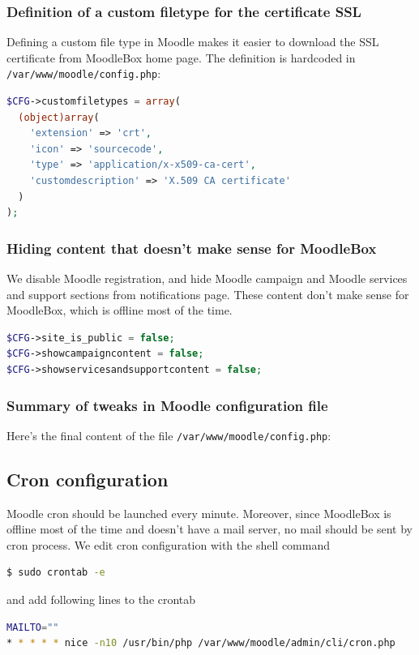 \documentclass[12pt]{article}
\begin{document}
\subsubsection{Definition of a custom filetype for the certificate SSL}

Defining a custom file type in Moodle makes it easier to download the SSL certificate from MoodleBox home page.
The definition is hardcoded in \lstinline{/var/www/moodle/config.php}:
\begin{lstlisting}[language=php]
$CFG->customfiletypes = array(
  (object)array(
    'extension' => 'crt',
    'icon' => 'sourcecode',
    'type' => 'application/x-x509-ca-cert',
    'customdescription' => 'X.509 CA certificate'
  )
);
\end{lstlisting}

\subsubsection{Hiding content that doesn't make sense for MoodleBox}

We disable Moodle registration, and hide Moodle campaign and Moodle services and support sections from notifications page.
These content don't make sense for MoodleBox, which is offline most of the time.
\begin{lstlisting}[language=php]
$CFG->site_is_public = false;
$CFG->showcampaigncontent = false;
$CFG->showservicesandsupportcontent = false;
\end{lstlisting}

\subsubsection{Summary of tweaks in Moodle configuration file}

Here's the final content of the file \lstinline{/var/www/moodle/config.php}:


\subsection{Cron configuration}

Moodle cron should be launched every minute.
Moreover, since MoodleBox is offline most of the time and doesn't have a mail server, no mail should be sent by cron process.
We edit cron configuration with the shell command
\begin{lstlisting}[language=bash]
$ sudo crontab -e
\end{lstlisting}
and add following lines to the crontab
\begin{lstlisting}[language=bash]
MAILTO=""
* * * * * nice -n10 /usr/bin/php /var/www/moodle/admin/cli/cron.php
\end{lstlisting}
\end{document}
